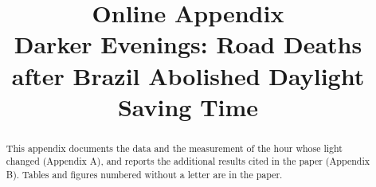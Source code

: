 \documentclass[AEJ,reviewmode]{AEA}
\begin{document}
\title{Online Appendix\\[4pt] Darker Evenings: Road Deaths after Brazil Abolished Daylight Saving Time}
\author{}
\date{}

\begin{abstract}
This appendix documents the data and the measurement of the hour whose light changed (Appendix A), and reports the additional results cited in the paper (Appendix B). Tables and figures numbered without a letter are in the paper.
\end{abstract}

\maketitle

\appendix
\makeatletter
\renewcommand\p@subsection{}
\renewcommand\section{\@startsection{section}{1}{\z@}{\abovesectionskip}%
  {\belowsectionskip}{\appendixsectionstyle}}
\makeatother


\clearpage


\end{document}
